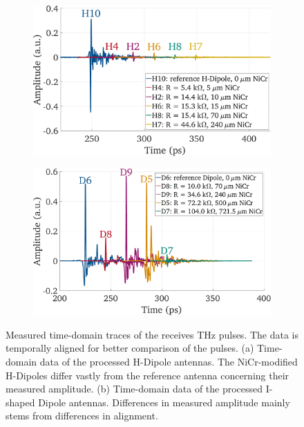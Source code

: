 \begin{figure}[!]
    \centering
    \begin{subfigure}[b]{0.49\textwidth}
        \centering
        \includegraphics[height=0.6\textwidth]{figures/Results/mainTextComp/comp_H_Dipoles_time.pdf}
        \caption{\centering}
        \label{comp_amp_HD}
    \end{subfigure}
    \hfill
    \begin{subfigure}[b]{0.49\textwidth}
        \centering
        \includegraphics[height=0.6\textwidth]{figures/Results/mainTextComp/comp_Dipoles_time.pdf}
        \caption{\centering}
        \label{comp_amp_D}
    \end{subfigure}
    \caption{Measured time-domain traces of the receives THz pulses. The data is temporally aligned for better comparison of the pulses. (a) Time-domain data of the processed H-Dipole antennas. The NiCr-modified H-Dipoles differ vastly from the reference antenna concerning their measured amplitude. (b) Time-domain data of the processed I-shaped Dipole antennas. Differences in measured amplitude mainly stems from differences in alignment.}
    \label{comp_antenna_amp}
\end{figure}

